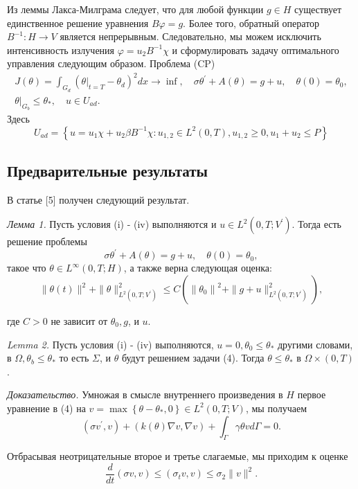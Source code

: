 Из леммы Лакса-Милграма следует, что для любой функции $g \in  H$ существует единственное
решение уравнения $B\varphi= g$.
Более того, обратный оператор $B ^{-1}: H \rightarrow V$ является непрерывным.
Следовательно, мы можем исключить интенсивность излучения $\varphi=u_{2} B ^ {-1} \chi$
и сформулировать задачу оптимального управления следующим образом.
Проблема (CP)
\[
    \begin{gathered}
        J(\theta)=\int_{G_{d}}\left(\left.\theta\right|_{t=T}-\theta_{d}\right)^{2} d x \rightarrow \inf ,
        \quad \sigma \theta^{\prime}+A(\theta)=g+u, \quad \theta(0)=\theta_{0}, \\
        \left.\theta\right|_{G_{b}} \leq \theta_{*}, \quad u \in U_{a d}.
    \end{gathered}
\]
Здесь
\[
    U_{a d}=\left\{u=u_{1} \chi+u_{2} \beta B^{-1} \chi: u_{1,2} \in L^{2}(0, T), u_{1,2}
    \geq 0, u_{1}+u_{2} \leq P\right\}
\]

\subsection{Предварительные результаты}
В статье [5] получен следующий результат.

\textit{Лемма 1.}
Пусть условия (i) - (iv) выполняются и $u \in L^{2}\left(0, T ; V^{\prime}\right)$.
Тогда есть решение проблемы
\[
    \sigma \theta^{\prime}+A(\theta)=g+u, \quad \theta(0)=\theta_{0},
\]
такое что $\theta \in L^{\infty}(0, T ; H)$, а также верна следующая оценка:
\[
    \|\theta(t)\|^{2}+\|\theta\|_{L^{2}\left(0, T ; V^{\prime}\right)}^{2} \leq C\left(\left\|\theta_{0}\right\|^{2}+\|g+u\|_{L^{2}\left(0, T ; V^{\prime}\right)}^{2}\right),
\]

где $C>0$ не зависит от $\theta_{0}, g$, и $u$.

\textit{Lemma 2.}
Пусть условия (i) - (iv) выполняются, $u=0, \theta_{0} \leq \theta_{*}$ другими словами,
в $\Omega, \theta_{b} \leq \theta_{*}$ то есть $\Sigma$, и $\theta$ будут решением задачи (4).
Тогда $\theta \leq \theta_{*}$ в $\Omega \times(0, T)$.

\textit{Доказательство.}
Умножая в смысле внутреннего произведения в $H$ первое уравнение в (4) на
$v=\max \left\{\theta-\theta_{*}, 0\right\}\in L^{2}(0, T; V)$, мы получаем
\[
    \left(\sigma v^{\prime}, v\right)+(k(\theta) \nabla v, \nabla v)+\int_{\Gamma} \gamma \theta v d \Gamma=0 .
\]

Отбрасывая неотрицательные второе и третье слагаемые, мы приходим к оценке
\[
    \frac{d}{d t}(\sigma v, v) \leq\left(\sigma_{t} v, v\right) \leq \sigma_{2}\|v\|^{2} .
\]

